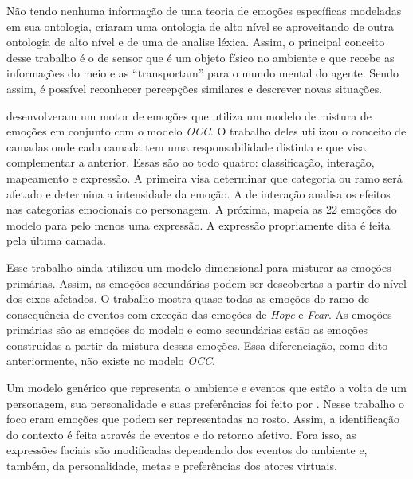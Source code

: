 Não tendo nenhuma informação de uma teoria de emoções específicas modeladas em
sua ontologia, \citet{wks2008towards} criaram uma ontologia de alto nível se
aproveitando de outra ontologia de alto nível e de uma de analise léxica.
Assim, o principal conceito desse trabalho é o de sensor que é um objeto
físico no ambiente e que recebe as informações do meio e as ``transportam''
para o mundo mental do agente. Sendo assim, é possível reconhecer
percepções similares e descrever novas situações.

\citet{springerlink:10.1007/978-3-642-01639-448} desenvolveram um motor de
emoções que utiliza um modelo de mistura de emoções em conjunto com o modelo
\emph{OCC}. O trabalho deles utilizou o conceito de camadas onde cada camada tem uma
responsabilidade distinta e que visa complementar a anterior. Essas são ao todo
quatro: classificação, interação, mapeamento e expressão. A primeira visa
determinar que categoria ou ramo será afetado e determina a
intensidade da emoção. A de interação analisa os efeitos nas categorias
emocionais do personagem. A próxima, mapeia as 22 emoções do modelo para pelo
menos uma expressão. A expressão propriamente dita é feita pela última camada.

Esse trabalho ainda utilizou um modelo dimensional para misturar as emoções
primárias. Assim, as emoções secundárias podem ser descobertas a partir do
nível dos eixos afetados. O trabalho mostra quase todas as emoções do
ramo de consequência de eventos com exceção das emoções de \emph{Hope} e
\emph{Fear}. As emoções primárias são as emoções do modelo \occ e como
secundárias estão as emoções construídas a partir da mistura dessas emoções.
Essa diferenciação, como dito anteriormente, não existe no modelo \emph{OCC}.

Um modelo genérico que representa o ambiente e eventos que estão a volta de um
personagem, sua personalidade e suas preferências foi feito por
\citet{lera2009semantic}. Nesse trabalho o foco eram emoções que podem ser
representadas no rosto. Assim, a identificação do contexto é feita através de
eventos e do retorno afetivo. Fora isso, as expressões faciais são modificadas
dependendo dos eventos do ambiente e, também, da personalidade, metas e
preferências dos atores virtuais.

